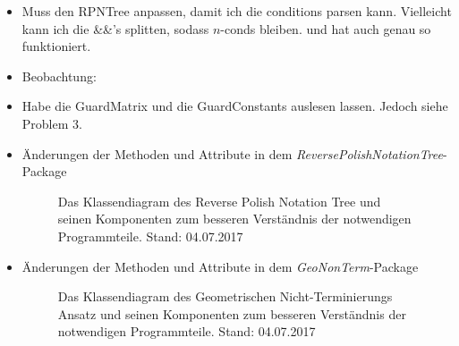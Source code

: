 \begin{itemize}
\begin{figure}[H]
		\end{figure}
	\item Muss den RPNTree anpassen, damit ich die conditions parsen kann. Vielleicht kann ich die \&\&'s splitten, sodass $n$-conds bleiben. \answer und hat auch genau so funktioniert.
	\item Beobachtung: 
	\item Habe die GuardMatrix und die GuardConstants auslesen lassen. Jedoch siehe Problem 3.
	\item Änderungen der Methoden und Attribute in dem \emph{ReversePolishNotationTree}-Package
		\begin{figure}[H]
			
			\caption{Das Klassendiagram des Reverse Polish Notation Tree und seinen Komponenten zum besseren Verständnis der notwendigen Programmteile. Stand: 04.07.2017}
			\label{04.07.2017:: RPNTree-classdiagram}
		\end{figure}
	\item Änderungen der Methoden und Attribute in dem \emph{GeoNonTerm}-Package
		\begin{figure}[H]
			\centering
			
			\caption{Das Klassendiagram des Geometrischen Nicht-Terminierungs Ansatz und seinen Komponenten zum besseren Verständnis der notwendigen Programmteile. Stand: 04.07.2017}
			\label{04.07.2017:: GeoNonTerm-classdiagram}
		\end{figure}
\end{itemize}

